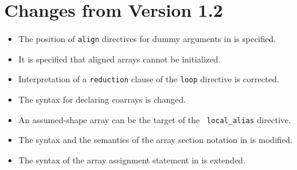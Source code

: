 \section{Changes from Version 1.2}

\begin{itemize}
  \item The position of {\tt align} directives for dummy arguments
		in {\XMPC} is specified.
  \item It is specified that aligned arrays cannot be initialized.
  \item Interpretation of a {\tt reduction} clause of the {\tt loop}
		directive is corrected.
  \item The syntax for declaring coarrays is changed.
  \item An assumed-shape array can be the target of the {\tt
		local\_alias} directive.
  \item The syntax and the semantics of the array section notation in
		{\XMPC} is modified.
  \item The syntax of the array assignment statement in {\XMPC} is
		extended.
\end{itemize}


\cleardoublepage

